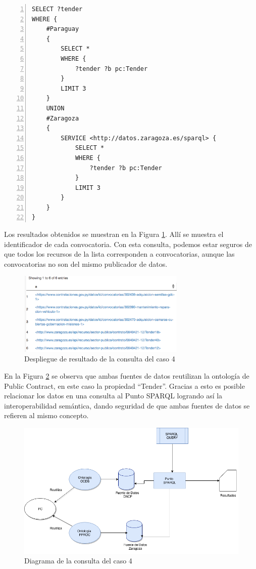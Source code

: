 \noindent\begin{minipage}[c]{\textwidth}
 \begin{lstlisting}[captionpos=b, caption=Consulta a dos fuentes de datos utilizando el mismo concepto, label={lst:caso4-2},  numbers=left,  numberstyle=\tiny\color{mygray},frame=single]
SELECT ?tender
WHERE {
    #Paraguay
    { 
        SELECT * 
        WHERE {
            ?tender ?b pc:Tender 
        } 
        LIMIT 3 
    }
    UNION 
    #Zaragoza
    { 
        SERVICE <http://datos.zaragoza.es/sparql> {
            SELECT * 
            WHERE {
                ?tender ?b pc:Tender 
            } 
            LIMIT 3
        }
    }
}
 \end{lstlisting}
\end{minipage}
 Los resultados obtenidos se muestran en la Figura \ref{img:caso4Resultado}. Allí se muestra el identificador de cada convocatoria. Con esta consulta, podemos estar seguros de que todos los recursos de la lista corresponden a convocatorias, aunque las convocatorias no son del mismo publicador de datos.



\begin{figure}[ht!]
    \centering
    \includegraphics[width=80mm]{figuras/caso4Resultado.png}
    \caption{Despliegue de resultado de la consulta del caso 4}
    \label{img:caso4Resultado}
 \end{figure}

 En la Figura \ref{img:Diagramas-Caso 4} se observa que ambas fuentes de datos reutilizan la ontología de Public Contract, en este caso la propiedad “Tender”. Gracias a esto es posible relacionar los datos en una consulta al Punto SPARQL logrando así la interoperabilidad semántica, dando seguridad de que ambas fuentes de datos se refieren al mismo concepto.

 \begin{figure}[ht!]
    \centering
    \includegraphics[width=150mm]{figuras/Diagramas-Caso4.png}
    \caption{Diagrama de la consulta del caso 4}
    \label{img:Diagramas-Caso 4}
 \end{figure}
